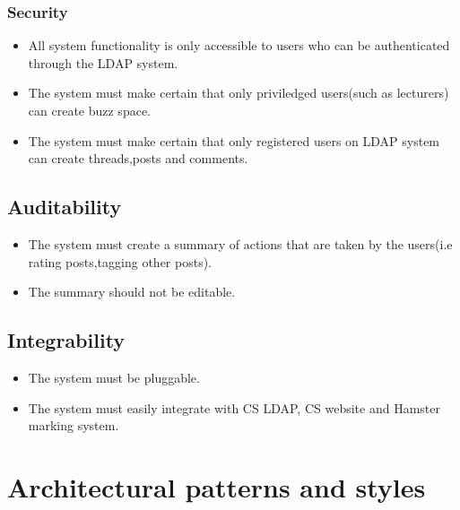 \documentclass[11pt,a4paper]{article}
\begin{document}
	\subsubsection*{Security}
	\begin{itemize}
		\item All system functionality is only accessible to users who can be authenticated through the LDAP system.
		\item The system must make certain that only priviledged users(such as lecturers) can create buzz space.
		\item The system must make certain that only registered users on LDAP system can create threads,posts and comments.
	\end{itemize}
	\subsection*{Auditability}
		\begin{itemize}
			\item The system must create a summary of actions that are taken by the users(i.e rating posts,tagging other posts).
			\item The summary should not be editable.
		\end{itemize}
	\subsection*{Integrability}
		\begin{itemize}
			\item The system must be pluggable.
			\item The system must easily integrate with CS LDAP, CS website and Hamster marking system.
		\end{itemize}
		
	\section{Architectural patterns and styles}
\end{document}
